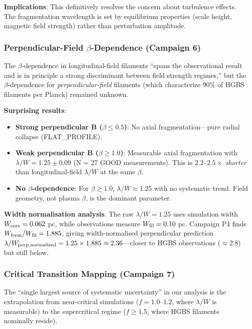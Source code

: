\documentclass[twocolumn]{mnras}
\begin{document}
\textbf{Implications}: This definitively resolves the concern about turbulence effects. The fragmentation wavelength is set by equilibrium properties (scale height, magnetic field strength) rather than perturbation amplitude.

\subsubsection{Perpendicular-Field $\beta$-Dependence (Campaign 6)}

The $\beta$-dependence in longitudinal-field filaments ``spans the observational result and is in principle a strong discriminant between field strength regimes,'' but the $\beta$-dependence for \textit{perpendicular-field} filaments (which characterize 90\% of HGBS filaments per Planck) remained unknown.

\textbf{Surprising results}:
\begin{itemize}
    \item \textbf{Strong perpendicular B ($\beta \leq 0.5$)}: No axial fragmentation---pure radial collapse (FLAT\_PROFILE).
    \item \textbf{Weak perpendicular B ($\beta \geq 1.0$)}: Measurable axial fragmentation with $\lambda/W = 1.25 \pm 0.09$ (N = 27 GOOD measurements). This is $2.2$--$2.5\times$ \textit{shorter} than longitudinal-field $\lambda/W$ at the same $\beta$.
    \item \textbf{No $\beta$-dependence}: For $\beta \geq 1.0$, $\lambda/W \approx 1.25$ with no systematic trend. Field geometry, not plasma $\beta$, is the dominant parameter.
\end{itemize}

\textbf{Width normalisation analysis}. The raw $\lambda/W = 1.25$ uses simulation width $W_{\rm core} = 0.062$ pc, while observations measure $W_{\rm fil} = 0.10$ pc. Campaign P4 finds $W_{\rm form}/W_{\rm fil} = 1.885$, giving width-normalised perpendicular prediction $\lambda/W_{\rm perp,normalised} = 1.25 \times 1.885 \approx 2.36$---closer to HGBS observations ($\approx 2.8$) but still below.

\subsubsection{Critical Transition Mapping (Campaign 7)}

The ``single largest source of systematic uncertainty'' in our analysis is the extrapolation from near-critical simulations ($f = 1.0$--$1.2$, where $\lambda/W$ is measurable) to the supercritical regime ($f \geq 1.5$, where HGBS filaments nominally reside).
\end{document}
